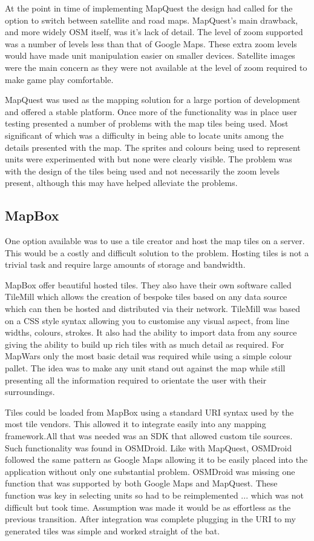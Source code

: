 At the point in time of implementing MapQuest the design had called for the option to switch between satellite and road maps. MapQuest's main drawback, and more widely OSM itself, was it's lack of detail. The level of zoom supported was a number of levels less than that of Google Maps. These extra zoom levels would have made unit manipulation easier on smaller devices. Satellite images were the main concern as they were not available at the level of zoom required to make game play comfortable.

MapQuest was used as the mapping solution for a large portion of development and offered a stable platform. Once more of the functionality was in place user testing presented a number of problems with the map tiles being used. Most significant of which was a difficulty in being able to locate units among the details presented with the map. The sprites and colours being used to represent units were experimented with but none were clearly visible. The problem was with the design of the tiles being used and not necessarily the zoom levels present, although this may have helped alleviate the problems.

\subsection{MapBox}
One option available was to use a tile creator and host the map tiles on a server. This would be a costly and difficult solution to the problem. Hosting tiles is not a trivial task and require large amounts of storage and bandwidth.

MapBox offer beautiful hosted tiles. They also have their own software called TileMill which allows the creation of bespoke tiles based on any data source which can then be hosted and distributed via their network. TileMill was based on a CSS style syntax allowing you to customise any visual aspect, from line widths, colours, strokes. It also had the ability to import data from any source giving the ability to build up rich tiles with as much detail as required. For MapWars only the most basic detail was required while using a simple colour pallet. The idea was to make any unit stand out against the map while still presenting all the information required to orientate the user with their surroundings. 

Tiles could be loaded from MapBox using a standard URI syntax used by the most tile vendors. This allowed it to integrate easily into any mapping framework.All that was needed was an SDK that allowed custom tile sources. Such functionality was found in OSMDroid. Like with MapQuest, OSMDroid followed the same pattern as Google Maps allowing it to be easily placed into the application without only one substantial problem. OSMDroid was missing one function that was supported by both Google Maps and MapQuest. These function was key in selecting units so had to be reimplemented ... which was not difficult but took time. Assumption was made it would be as effortless as the previous transition. After integration was complete plugging in the URI to my generated tiles was simple and worked straight of the bat.

